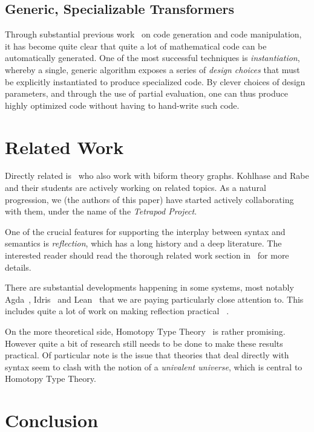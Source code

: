 \documentclass[fleqn]{llncs}
\begin{document}
\subsection*{Generic, Specializable Transformers}

Through substantial previous work~%
\cite{CaretteKS09,Carette06,CaElSm11,MathSchemeExper,CaretteKiselyov2005,CaretteKiselyov11,CaretteKucera07,CaretteKucera11,carette2016simplifying,KuceraCarette06,Larjani13,narayanan2016probabilistic}
on code generation and code manipulation, it has become quite clear that
quite a lot of mathematical code can be automatically generated.
One of the most successful techniques is \emph{instantiation},
whereby a single, generic algorithm exposes a series of
\emph{design choices} that must be explicitly instantiated to produce
specialized code. By clever choices of design parameters, and through the
use of partial evaluation, one can thus produce highly optimized code
without having to hand-write such code.

\section{Related Work}

Directly related is~\cite{KohManRab13} who also work with biform theory
graphs. Kohlhase and Rabe and their students are actively working on
related topics. As a natural progression, we (the authors of this paper)
have started actively collaborating with them, under the name of the
\emph{Tetrapod Project}.

One of the crucial features for supporting the interplay between
syntax and semantics is \emph{reflection}, which has a long history
and a deep literature. The interested reader should read the 
thorough related work section in~\cite{Farmer18} for more details.

There are substantial developments happening in some systems, most
notably Agda~\cite{Norell07,Norell09}, Idris~\cite{Brady13} and
Lean~\cite{Lean} that we are paying particularly close attention to.  This includes
quite a lot of work on making reflection practical~%
\cite{ebner2017metaprogramming,Christiansen:2014,Christiansen:2016,VanDerWalt12}.

On the more theoretical side, Homotopy Type Theory~\cite{hottbook}
is rather promising.  However quite a bit of research still needs to be
done to make these results practical. Of particular note is the issue
that theories that deal directly with syntax seem to clash with the
notion of a \emph{univalent universe}, which is central to Homotopy
Type Theory.

\section{Conclusion}




\end{document}
